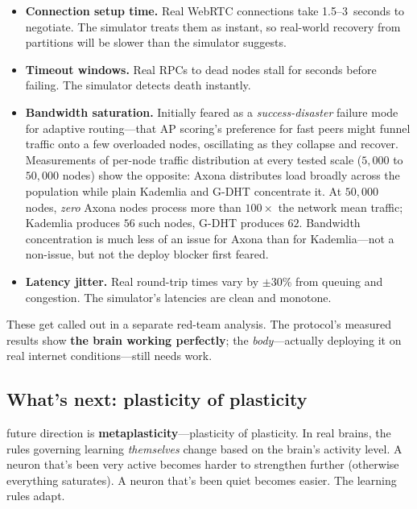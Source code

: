 \documentclass[nobib,justified]{tufte-handout}
\begin{document}
\begin{itemize}
  \item \textbf{Connection setup time.} Real WebRTC connections take 1.5--3~seconds to negotiate. The simulator treats them as instant, so real-world recovery from partitions will be slower than the simulator suggests.
  \item \textbf{Timeout windows.} Real RPCs to dead nodes stall for seconds before failing. The simulator detects death instantly.
  \item \textbf{Bandwidth saturation.} Initially feared as a \emph{success-disaster} failure mode for adaptive routing---that AP scoring's preference for fast peers might funnel traffic onto a few overloaded nodes, oscillating as they collapse and recover. Measurements of per-node traffic distribution at every tested scale ($5{,}000$ to $50{,}000$ nodes) show the opposite: Axona distributes load broadly across the population while plain Kademlia and G-DHT concentrate it. At $50{,}000$ nodes, \emph{zero} Axona nodes process more than $100\times$ the network mean traffic; Kademlia produces $56$ such nodes, G-DHT produces $62$. Bandwidth concentration is much less of an issue for Axona than for Kademlia---not a non-issue, but not the deploy blocker first feared.
  \item \textbf{Latency jitter.} Real round-trip times vary by $\pm$30\% from queuing and congestion. The simulator's latencies are clean and monotone.
\end{itemize}

These get called out in a separate red-team analysis. The protocol's measured results show \textbf{the brain working perfectly}; the \emph{body}---actually deploying it on real internet conditions---still needs work.

\subsection{What's next: plasticity of plasticity}

 future direction is \textbf{metaplasticity}---plasticity of plasticity. In real brains, the rules governing learning \emph{themselves} change based on the brain's activity level. A neuron that's been very active becomes harder to strengthen further (otherwise everything saturates). A neuron that's been quiet becomes easier. The learning rules adapt.
\end{document}
